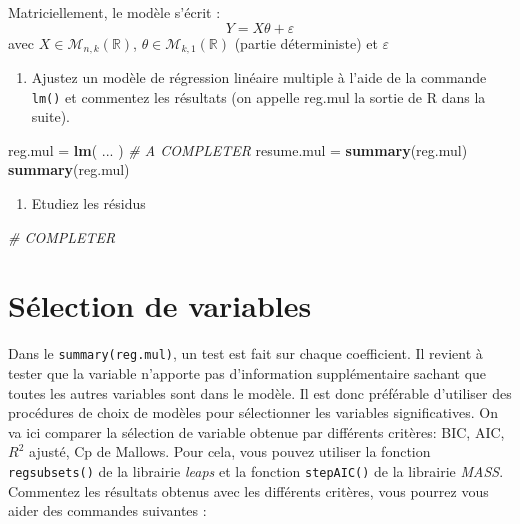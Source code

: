 \documentclass[
]{article}
\newenvironment{Shaded}{\begin{snugshade}}{\end{snugshade}}
\newcommand{\CommentTok}[1]{\textcolor[rgb]{0.56,0.35,0.01}{\textit{#1}}}
\newcommand{\FunctionTok}[1]{\textcolor[rgb]{0.13,0.29,0.53}{\textbf{#1}}}
\newcommand{\NormalTok}[1]{#1}
\newcommand{\OtherTok}[1]{\textcolor[rgb]{0.56,0.35,0.01}{#1}}
\providecommand{\tightlist}{%
  \setlength{\itemsep}{0pt}\setlength{\parskip}{0pt}}
\begin{document}
Matriciellement, le modèle s'écrit : \[
Y = X\theta + \varepsilon 
\] avec \(X \in \mathcal{M}_{n,k}(\mathbb{R})\),
\(\theta \in \mathcal{M}_{k,1}(\mathbb{R})\) (partie déterministe) et
\(\varepsilon\)

\begin{enumerate}
\def\labelenumi{\arabic{enumi}.}
\setcounter{enumi}{2}
\tightlist
\item
  Ajustez un modèle de régression linéaire multiple à l'aide de la
  commande \texttt{lm()} et commentez les résultats (on appelle reg.mul
  la sortie de R dans la suite).
\end{enumerate}

\begin{Shaded}
\begin{Highlighting}[]
\NormalTok{reg.mul }\OtherTok{=} \FunctionTok{lm}\NormalTok{( ... ) }\CommentTok{\# A COMPLETER}
\NormalTok{resume.mul }\OtherTok{=} \FunctionTok{summary}\NormalTok{(reg.mul)}
\FunctionTok{summary}\NormalTok{(reg.mul)}
\end{Highlighting}
\end{Shaded}

\begin{enumerate}
\def\labelenumi{\arabic{enumi}.}
\setcounter{enumi}{3}
\tightlist
\item
  Etudiez les résidus
\end{enumerate}

\begin{Shaded}
\begin{Highlighting}[]
\CommentTok{\# COMPLETER}
\end{Highlighting}
\end{Shaded}

\hypertarget{suxe9lection-de-variables}{%
\section{Sélection de variables}\label{suxe9lection-de-variables}}

Dans le \texttt{summary(reg.mul)}, un test est fait sur chaque
coefficient. Il revient à tester que la variable n'apporte pas
d'information supplémentaire sachant que toutes les autres variables
sont dans le modèle. Il est donc préférable d'utiliser des procédures de
choix de modèles pour sélectionner les variables significatives. On va
ici comparer la sélection de variable obtenue par différents critères:
BIC, AIC, \(R^2\) ajusté, Cp de Mallows. Pour cela, vous pouvez utiliser
la fonction \texttt{regsubsets()} de la librairie \emph{leaps} et la
fonction \texttt{stepAIC()} de la librairie \emph{MASS}. Commentez les
résultats obtenus avec les différents critères, vous pourrez vous aider
des commandes suivantes :
\end{document}
